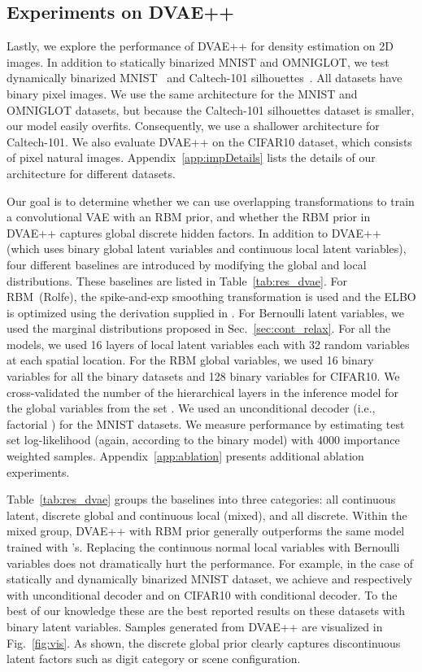 \documentclass{article}
\begin{document}
\subsection{Experiments on DVAE++} \label{sec:dvae_expr}

Lastly, we explore the performance of DVAE++ for density estimation on 2D images. In addition to statically binarized MNIST and 
OMNIGLOT, we test dynamically binarized MNIST~\cite{lecun1998gradient}
and Caltech-101 silhouettes~\cite{marlin2010inductive}. 
All datasets have  binary pixel images. We use the same architecture for
the MNIST and OMNIGLOT datasets, but because the Caltech-101 silhouettes dataset 
is smaller, our model easily overfits. Consequently, we use a shallower architecture for Caltech-101.
We also evaluate DVAE++ on the CIFAR10 dataset, which consists of  pixel natural images. 
Appendix~\ref{app:impDetails} lists the details of our architecture for different datasets.

Our goal is to determine whether we can use overlapping transformations to train a convolutional VAE with an RBM prior, and whether
the RBM prior in DVAE++ captures global discrete hidden factors.
In addition to DVAE++ (which uses binary global latent variables and continuous local latent variables), four different 
baselines are introduced by modifying the global and local distributions.
These baselines are listed in Table~\ref{tab:res_dvae}. For RBM~(Rolfe), the spike-and-exp smoothing transformation
is used and the ELBO is optimized using the derivation supplied in \cite{rolfe2016discrete}. For Bernoulli latent variables, we used
the marginal distributions proposed in Sec.~\ref{sec:cont_relax}.
For all the models, we used 16 layers of local latent variables each with 32 random variables at each spatial location.
For the RBM global variables, we used 16 binary variables for all the binary datasets and 
128 binary variables for CIFAR10. We cross-validated the number of the hierarchical layers 
in the inference model for the global variables from the set . We used an unconditional decoder 
(i.e., factorial ) for the MNIST datasets. 
We measure performance by estimating test set log-likelihood (again, according to the binary model) with 4000 importance weighted samples.
Appendix~\ref{app:ablation} presents additional ablation experiments. 

Table~\ref{tab:res_dvae} groups the baselines into three categories: all continuous latent, discrete global and continuous local (mixed), and all discrete. Within the mixed 
group, DVAE++ with RBM prior generally outperforms the same model trained with \cite{rolfe2016discrete}'s. Replacing the continuous normal local variables with Bernoulli variables does not dramatically hurt the performance. For example, in the case of statically and dynamically binarized MNIST dataset, we achieve  and  respectively with unconditional 
decoder and  on CIFAR10 with conditional decoder. To the best of our knowledge these are the best reported results on these datasets with binary latent variables. 
Samples generated from DVAE++ are visualized in Fig.~\ref{fig:vis}. As shown, the discrete global prior clearly captures discontinuous latent factors such as digit category or scene configuration.
\end{document}
